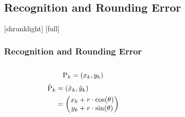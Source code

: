\documentclass[12pt,compress,aspectratio=169]{beamer} %
\begin{document}
\subsection{Recognition and Rounding Error}
[shrunklight]
[full]
\begin{frame}[t]
	\frametitle{Recognition and Rounding Error}
	\vspace{-0.5cm} %
	\begin{columns}[t]
	
	\begin{column}{0.3\textwidth}
	\begin{equation*}
	\operatorname{P}_k = (x_k, y_k)
	\end{equation*}
	\begin{equation*}
	\begin{aligned}
	\hat{\operatorname{P}}_k {} & = (\hat{x}_k, \hat{y}_k) \\
	 & = \left( 
	     \begin{matrix} 
	 			x_k + r \cdot \cos (\theta) \\
	             y_k +  r \cdot \sin (\theta) 
	     \end{matrix} 
	    \right)
	\end{aligned}
	\end{equation*}
	\end{column}
	
	\begin{column}{0.7\textwidth}
	\begin{center}
	\vspace*{-0.3cm}
	\end{center}
	\end{column}
	
	\end{columns}
\end{frame}
\end{document}
